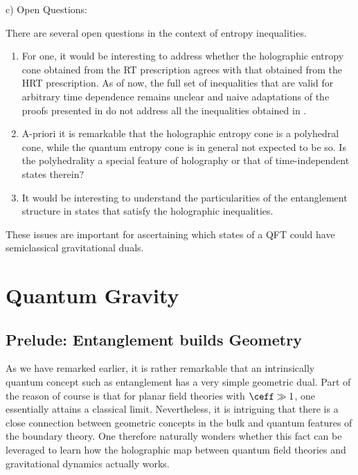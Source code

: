 \documentclass[12pt,openany]{book}
\begin{document}
\subparagraph{c) Open Questions:}
There are several open questions in the context of entropy inequalities.
\begin{enumerate}
\item For one, it would be interesting to address whether the holographic entropy cone obtained from the RT prescription agrees with that obtained from the HRT prescription.
As of now, the full set of inequalities that are valid for arbitrary time dependence remains unclear and naive adaptations of the proofs presented in \cite{Wall:2012uf} do not address all the inequalities obtained in \cite{Bao:2015bfa}.

\item A-priori it is remarkable that the holographic entropy cone is a polyhedral cone, while the quantum entropy cone is in general not expected to be so. Is the polyhedrality a special feature of holography or that of time-independent states therein?

\item It would be interesting to understand the particularities of the entanglement structure in states that satisfy the holographic inequalities.

\end{enumerate}
These issues are important for ascertaining which states of a QFT could have semiclassical gravitational duals.



\newpage
\part{Quantum Gravity}
\label{part:qg}

\chapter{Prelude: Entanglement builds Geometry}
\label{sec:pegeo}

As we have remarked earlier, it is rather remarkable that an intrinsically quantum concept such as entanglement has a very simple geometric dual. Part of the reason of course is that for planar field theories with $\ceff \gg 1 $, one essentially attains a classical limit. Nevertheless, it is intriguing that there is a close connection between geometric concepts in the bulk and quantum features of the boundary theory. One therefore naturally wonders whether this fact can be leveraged to learn how the holographic map between quantum field theories and gravitational dynamics actually works.
\end{document}
